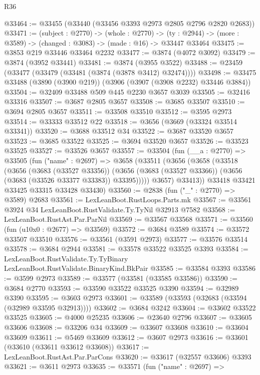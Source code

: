 \begin{lexlean}{R36}
\begin{coremodule}
@33464 := @33455 (@33440 (@33456 @3393 @2973 @2805 @2796 @2820 @2683))
@33471 := (subject : @2770) ->
  (whole : @2770) ->
  (ty : @2944) -> (more : @3589) -> (changed : @3083) -> (made : @16) -> @33447 @33464
@33475 := @3853 @219 @33446 @33464 @2232
@33477 := @3874 (@4072 @3092)
@33479 := @3874 (@3952 @33441)
@33481 := @3874 (@3955 @3522)
@33488 := @23459 (@33477 (@33479 (@33481 (@3874 (@3878 @3412) @32474))))
@33498 := @33475 @33488 (@3890 (@3900 @219)) (@3906 (@3907 (@3908 @2232) @33446 @3884))
@33504 := @32409 @33488 @509 @445 @2230 @3657 @3039
@33505 := @32416 @33316
@33507 := @3687 @2805 @3657
@33508 := @3685 @33507
@33510 := @3694 @2805 @3657
@33511 := @33508 @33510
@33512 := @3595 @2973
@33514 := @33333 @33512 @22
@33518 := @3656 (@3669 (@33324 @33514 @33341))
@33520 := @3688 @33512 @34
@33522 := @3687 @33520 @3657
@33523 := @3685 @33522
@33525 := @3694 @33520 @3657
@33526 := @33523 @33525
@33527 := @33526 @3657
@33557 := @33504
    (fun (__a : @2770) =>
    @33505
      (fun ("name" : @2697) =>
      @3658
        (@33511
          (@3656
            (@3658
              (@33518
                (@3656
                  (@3683 (@33527 @33356))
                  (@3656 (@3683 (@33527 @33366)) (@3656 (@3683 (@33526 @33377 @33383)) @33395)))))
            @3657)
          @33413))
      @33418
      @33421
      @33425
      @33315
      @33428
      @33430)
@33560 := @2838 (fun ("_" : @2770) => @3589) @2683
@33561 := LexLeanBoot.RustLoops.Parts.mk
@33567 := @33561 @3924 @34 LexLeanBoot.RustValidate.Ty.TyNil @32913 @7582
@33568 := LexLeanBoot.RustAst.Par.ParNil
@33569 := @33567 @33568
@33571 := @33560 (fun (u10x0 : @2677) => @33569)
@33572 := @3684 @3589
@33574 := @33572 @33507 @33510
@33576 := @33561 (@3591 @2973)
@33577 := @33576 @33514
@33578 := @3684 @2944
@33581 := @33578 @33522 @33525 @3393
@33584 := LexLeanBoot.RustValidate.Ty.TyBinary LexLeanBoot.RustValidate.BinaryKind.BkPair
@33585 := @33584 @3393
@33586 := @3599 @2973
@33589 := @33577 (@33581 (@33585 @33586))
@33590 := @3684 @2770
@33593 := @33590 @33522 @33525 @3390
@33594 := @32989 @3390
@33595 := @3603 @2973
@33601 := @33589 (@33593 (@32683 (@33594 (@32989 @33595 @32913))))
@33602 := @3684 @3242
@33604 := @33602 @33522 @33525
@33605 := @4000 @25235
@33606 := @23640 @2796
@33607 := @33605 @33606
@33608 := @33206 @34
@33609 := @33607 @33608
@33610 := @33604 @33609
@33611 := @5469 @33609
@33612 := @3607 @2973
@33616 := @33601 (@33610 (@33611 @33612 @33608))
@33617 := LexLeanBoot.RustAst.Par.ParCons
@33620 := @33617 (@32557 @33606) @3393
@33621 := @3611 @2973
@33635 := @33571
    (fun ("name" : @2697) =>

\end{coremodule}
\end{lexlean}
